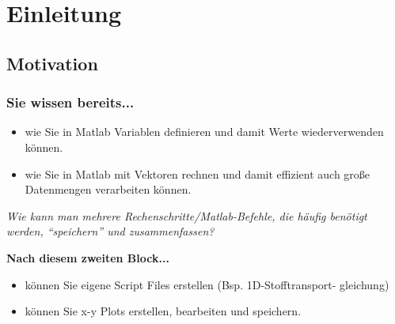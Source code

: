 



\setcounter{mchapter}{2}
\setcounter{mexercise}{0}


  

    \section{Einleitung}

    \subsection{Motivation}
    \begin{frame}
        \frametitle{Sie wissen bereits...}
        \begin{itemize}
            \item wie Sie in Matlab Variablen definieren und damit Werte wiederverwenden können.
            \item wie Sie in Matlab mit Vektoren rechnen und damit effizient auch große Datenmengen verarbeiten können.
        \end{itemize}

        \vspace{0.3cm}

        \textit{Wie kann man mehrere Rechenschritte/Matlab-Befehle, die häufig benötigt werden, ``speichern'' und zusammenfassen?} \\

        \vspace{0.3cm}

        \textbf{Nach diesem zweiten Block...} \\

        \vspace{0.3cm}

        \begin{itemize}
            \item können Sie eigene Script Files erstellen (Bsp. 1D-Stofftransport- gleichung)
            \item können Sie x-y Plots erstellen, bearbeiten und speichern.
        \end{itemize}
    \end{frame}


